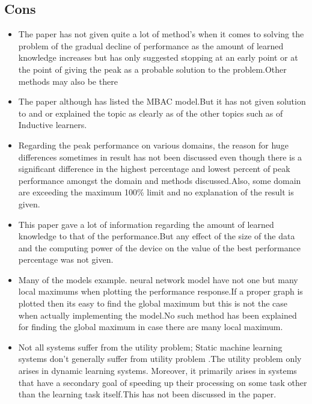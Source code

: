 \documentclass{bmvc2k}
\begin{document}
\subsection{Cons}
\begin{itemize}
    \item The paper has not given quite a lot of method's when it comes to solving the problem of the gradual decline of performance as the amount of learned knowledge increases  but has only suggested stopping at an early point  or at the point of giving the peak as a probable solution to the problem.Other methods may also be there
    
    \item The paper although has listed the MBAC model.But it has not given solution to and or explained the topic as clearly as of the other topics such as of Inductive learners.
    
    \item Regarding the peak performance on various domains, the reason for huge differences sometimes in  result  has not been discussed even though there is a significant difference in the highest percentage and lowest percent of peak performance amongst the domain and methods  discussed.Also, some domain are exceeding the maximum 100\% limit and no explanation of the result is given.
    
    \item This paper gave a lot of information regarding the amount of learned knowledge to that of the performance.But any effect of the size of the data and the computing power of the device on the value of the best performance percentage was not given.
    
    \item Many of the models example. neural network model have not one but many local maximums when plotting the performance response.If a proper graph is plotted then its easy to find the global maximum but this is not the case when actually implementing the model.No such method has been explained for finding the global maximum in case there are many local maximum.
    
    \item Not all systems suffer from the utility problem; Static machine learning systems don't generally suffer from utility problem .The utility problem only arises in dynamic learning systems. Moreover, it primarily arises in systems that have a secondary goal of speeding up their processing on some task other than the learning task itself.This has not been discussed in the paper.
    
\end{itemize}
\end{document}
